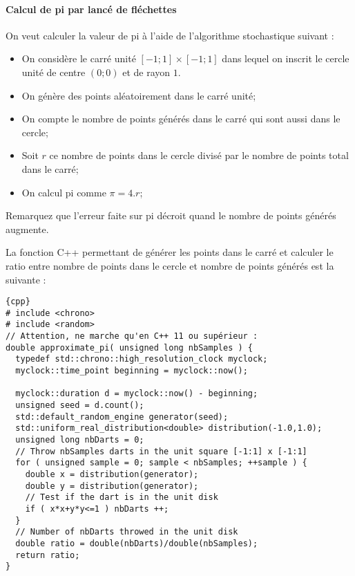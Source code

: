 \documentclass[11pt,a4paper]{article}
\begin{document}
\paragraph{Calcul de pi par lancé de fléchettes}

On veut calculer la valeur de pi à l'aide de l'algorithme stochastique suivant :
\begin{itemize}
\item On considère le carré unité
$\left[-1;1\right]\times \left[-1;1\right]$ dans lequel on inscrit le cercle unité de centre $(0;0)$ et de rayon $1$. 
\item On génère des points aléatoirement dans le carré unité;
\item On compte le nombre de points générés dans le carré qui sont aussi dans le cercle;
\item Soit $r$ ce nombre de points dans le cercle divisé par le nombre de points total dans le carré;
\item On calcul pi comme $\pi = 4.r$;
\end{itemize}

Remarquez que l'erreur faite sur pi décroit quand le nombre de points générés augmente.

\begin{center}
\end{center}

La fonction C++ permettant de générer les points dans le carré et calculer le ratio entre nombre
de points dans le cercle et nombre de points générés est la suivante :

\begin{lstlisting}{cpp}
# include <chrono>
# include <random>
// Attention, ne marche qu'en C++ 11 ou supérieur :
double approximate_pi( unsigned long nbSamples ) {
  typedef std::chrono::high_resolution_clock myclock;
  myclock::time_point beginning = myclock::now();

  myclock::duration d = myclock::now() - beginning;
  unsigned seed = d.count();
  std::default_random_engine generator(seed);
  std::uniform_real_distribution<double> distribution(-1.0,1.0);
  unsigned long nbDarts = 0;
  // Throw nbSamples darts in the unit square [-1:1] x [-1:1]
  for ( unsigned sample = 0; sample < nbSamples; ++sample ) {
    double x = distribution(generator);
    double y = distribution(generator);
    // Test if the dart is in the unit disk
    if ( x*x+y*y<=1 ) nbDarts ++;
  }
  // Number of nbDarts throwed in the unit disk
  double ratio = double(nbDarts)/double(nbSamples);
  return ratio;
}
\end{lstlisting}
\end{document}
